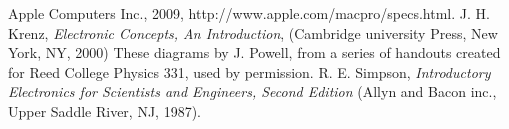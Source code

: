 \documentclass[aps,pre,twocolumn,nofootinbib]{revtex4}
\begin{document}
	\begin{thebibliography}{99}
 Apple Computers Inc., 2009, http://www.apple.com/macpro/specs.html.
 J. H. Krenz, \textit{Electronic Concepts, An Introduction}, (Cambridge university Press, New York, NY, 2000)
 These diagrams by J. Powell, from a series of handouts created for Reed College Physics 331, used by permission.  
 R. E. Simpson, \textit{Introductory Electronics for Scientists and Engineers, Second Edition} (Allyn and Bacon inc., Upper Saddle River, NJ, 1987).
	\end{thebibliography}
\end{document}
